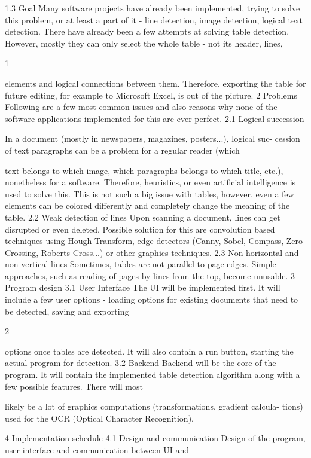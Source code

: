 1.3 Goal
Many software projects have already been implemented, trying to solve this
problem, or at least a part of it - line detection, image detection, logical text
detection. There have already been a few attempts at solving table detection.
However, mostly they can only select the whole table - not its header, lines,

1

elements and logical connections between them. Therefore, exporting the
table for future editing, for example to Microsoft Excel, is out of the picture.
2 Problems
Following are a few most common issues and also reasons why none of the
software applications implemented for this are ever perfect.
2.1 Logical succession

In a document (mostly in newspapers, magazines, posters...), logical suc-
cession of text paragraphs can be a problem for a regular reader (which

text belongs to which image, which paragraphs belongs to which title, etc.),
nonetheless for a software. Therefore, heuristics, or even artificial intelligence
is used to solve this. This is not such a big issue with tables, however, even a
few elements can be colored differently and completely change the meaning
of the table.
2.2 Weak detection of lines
Upon scanning a document, lines can get disrupted or even deleted. Possible
solution for this are convolution based techniques using Hough Transform,
edge detectors (Canny, Sobel, Compass, Zero Crossing, Roberts Cross...) or
other graphics techniques.
2.3 Non-horizontal and non-vertical lines
Sometimes, tables are not parallel to page edges. Simple approaches, such
as reading of pages by lines from the top, become unusable.
3 Program design
3.1 User Interface
The UI will be implemented first. It will include a few user options - loading
options for existing documents that need to be detected, saving and exporting

2

options once tables are detected. It will also contain a run button, starting
the actual program for detection.
3.2 Backend
Backend will be the core of the program. It will contain the implemented
table detection algorithm along with a few possible features. There will most

likely be a lot of graphics computations (transformations, gradient calcula-
tions) used for the OCR (Optical Character Recognition).

4 Implementation schedule
4.1 Design and communication
Design of the program, user interface and communication between UI and

